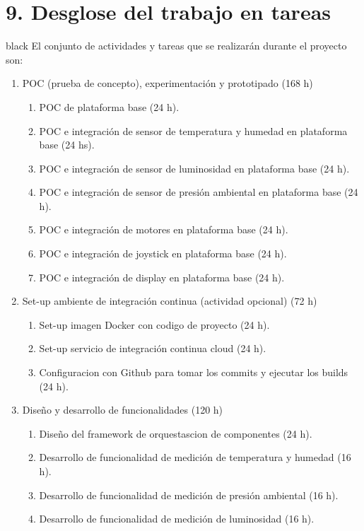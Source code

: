 \documentclass[
11pt, %
codirector, %
]{charter}
\begin{document}
\section{9. Desglose del trabajo en tareas}
\label{sec:wbs}

\begin{consigna}{black}
El conjunto de actividades y tareas que se realizarán durante el proyecto son:

\begin{enumerate}
\item POC (prueba de concepto), experimentación y prototipado (168 h)
	\begin{enumerate}
	\item POC de plataforma base (24 h).
	\item POC e integración de sensor de temperatura y humedad en plataforma base (24 hs).
	\item POC e integración de sensor de luminosidad en plataforma base (24 h).
	\item POC e integración de sensor de presión ambiental en plataforma base (24 h).
	\item POC e integración de motores en plataforma base (24 h).
	\item POC e integración de joystick en plataforma base (24 h).
	\item POC e integración de display en plataforma base (24 h).
	\end{enumerate}
\item Set-up ambiente de integración continua (actividad opcional) (72 h)
	\begin{enumerate}
	\item Set-up imagen Docker con codigo de proyecto (24 h).
	\item Set-up servicio de integración continua cloud (24 h).
	\item Configuracion con Github para tomar los commits y ejecutar los builds (24 h).
	\end{enumerate}
\item Diseño y desarrollo de funcionalidades (120 h)
	\begin{enumerate}
	\item Diseño del framework de orquestascion de componentes (24 h).
	\item Desarrollo de funcionalidad de medición de temperatura y humedad (16 h).
	\item Desarrollo de funcionalidad de medición de presión ambiental (16 h).
	\item Desarrollo de funcionalidad de medición de luminosidad (16 h).

\end{enumerate}
\end{enumerate}
\end{consigna}
\end{document}
